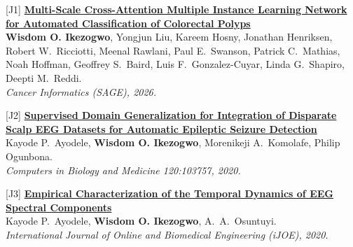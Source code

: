 \documentclass[10pt,letterpaper]{article}
\newcommand{\cvsub}[1]{\vspace{1.5mm}{\scshape\bfseries #1}\par\vspace{0.5mm}}
\newcommand{\ptitle}[2]{{\bfseries\color{linkc}\href{#1}{#2}}}
\newcommand{\me}{\textbf{Wisdom O. Ikezogwo}}
\newcommand{\venue}[1]{\textit{#1}}
\begin{document}
\cvsub{Journal Articles}
\begin{pubs}
  \item[{[J1]}] \ptitle{https://journals.sagepub.com/home/cix}{Multi-Scale Cross-Attention Multiple Instance Learning Network for Automated Classification of Colorectal Polyps}\\
  \me, Yongjun Liu, Kareem Hosny, Jonathan Henriksen, Robert W.\ Ricciotti, Meenal Rawlani, Paul E.\ Swanson, Patrick C.\ Mathias, Noah Hoffman, Geoffrey S.\ Baird, Luis F.\ Gonzalez-Cuyar, Linda G.\ Shapiro, Deepti M.\ Reddi.\\
  \venue{Cancer Informatics (SAGE), 2026.}
  \item[{[J2]}] \ptitle{https://doi.org/10.1016/j.compbiomed.2020.103757}{Supervised Domain Generalization for Integration of Disparate Scalp EEG Datasets for Automatic Epileptic Seizure Detection}\\
  Kayode P.\ Ayodele, \me, Morenikeji A.\ Komolafe, Philip Ogunbona.\\
  \venue{Computers in Biology and Medicine 120:103757, 2020.}
  \item[{[J3]}] \ptitle{https://doi.org/10.3991/ijoe.v16i15.16663}{Empirical Characterization of the Temporal Dynamics of EEG Spectral Components}\\
  Kayode P.\ Ayodele, \me, A.\ A.\ Osuntuyi.\\
  \venue{International Journal of Online and Biomedical Engineering (iJOE), 2020.}
\end{pubs}
\end{document}
